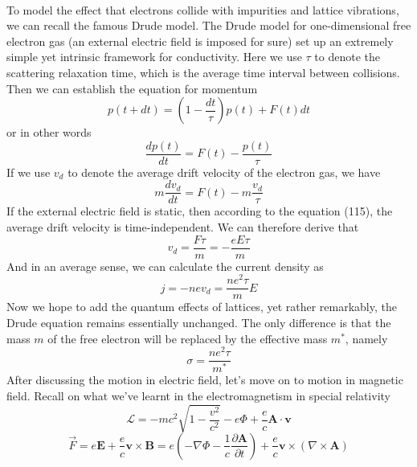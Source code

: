 \documentclass{article}
\begin{document}
\\
To model the effect that electrons collide with impurities and lattice vibrations, we can recall the famous Drude model. The Drude model for one-dimensional free electron gas (an external electric field is imposed for sure) set up an extremely simple yet intrinsic framework for conductivity. Here we use $\tau$ to denote the scattering relaxation time, which is the average time interval between collisions. Then we can establish the equation for momentum\begin{equation}
    p(t+dt)=(1-\frac{dt}{\tau})p(t)+F(t)dt
\end{equation}or in other words\begin{equation}
    \frac{dp(t)}{dt}=F(t)-\frac{p(t)}{\tau}
\end{equation}If we use $v_d$ to denote the average drift velocity of the electron gas, we have\begin{equation}
    m\frac{dv_d}{dt}=F(t)-m\frac{v_d}{\tau}
\end{equation}If the external electric field is static, then according to the equation (115), the average drift velocity is time-independent. We can therefore derive that\begin{equation}
    v_d=\frac{F\tau}{m}=-\frac{eE\tau}{m}
\end{equation}And in an average sense, we can calculate the current density as\begin{equation}
    j=-nev_d=\frac{ne^2\tau}{m}E
\end{equation}Now we hope to add the quantum effects of lattices, yet rather remarkably, the Drude equation remains essentially unchanged. The only difference is that the mass $m$ of the free electron will be replaced by the effective mass $m^*$, namely\begin{equation}
    \sigma=\frac{ne^2\tau}{m^*}
\end{equation}After discussing the motion in electric field, let's move on to motion in magnetic field. Recall on what we've learnt in the electromagnetism in special relativity\begin{equation}
    \mathcal{L}=-mc^2\sqrt{1-\frac{v^2}{c^2}}-e\Phi+\frac{e}{c}\mathbf{A}\cdot\mathbf{v}
\end{equation}\begin{equation}
    \vec{F}=e\mathbf{E}+\frac{e}{c}\mathbf{v}\times\mathbf{B}=e(-\nabla\Phi-\frac{1}{c}\frac{\partial\mathbf{A}}{\partial{t}})+\frac{e}{c}\mathbf{v}\times(\nabla\times\mathbf{A})
\end{equation}
\end{document}
